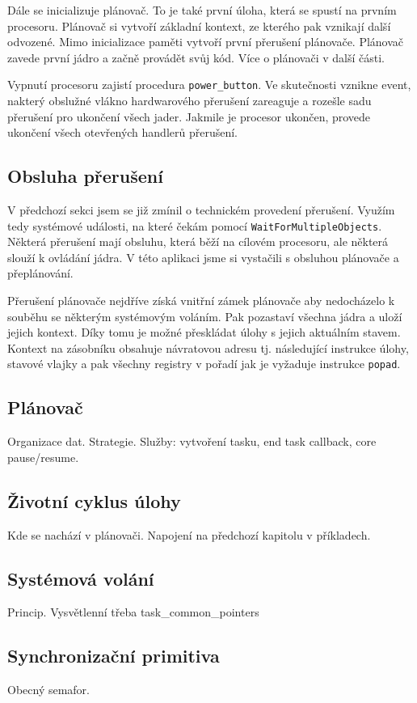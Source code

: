 \documentclass[a4paper,12pt]{article}
\begin{document}
Dále se inicializuje plánovač. To je také první úloha, která se spustí na prvním procesoru.
Plánovač si vytvoří základní kontext, ze kterého pak vznikají další odvozené. Mimo inicializace
paměti vytvoří první přerušení plánovače. Plánovač zavede první jádro a začně provádět
svůj kód. Více o plánovači v další části.

Vypnutí procesoru zajistí procedura \verb+power_button+. Ve skutečnosti vznikne event,
nakterý obslužné vlákno hardwarového přerušení zareaguje a rozešle sadu přerušení pro
ukončení všech jader. Jakmile je procesor ukončen, provede ukončení všech otevřených
handlerů přerušení.

\subsection{Obsluha přerušení}
V předchozí sekci jsem se již zmínil o technickém provedení přerušení. Využím tedy systémové
události, na které čekám pomocí \verb+WaitForMultipleObjects+. Některá přerušení mají
obsluhu, která běží na cílovém procesoru, ale některá slouží k ovládání jádra.
V této aplikaci jsme si vystačili s obsluhou plánovače a přeplánování.

Přerušení plánovače nejdříve získá vnitřní zámek plánovače aby nedocházelo k souběhu
se některým systémovým voláním. Pak pozastaví všechna jádra a uloží jejich kontext.
Díky tomu je možné přeskládat úlohy s jejich aktuálním stavem. Kontext na zásobníku
obsahuje návratovou adresu tj. následující instrukce úlohy, stavové vlajky a pak všechny
registry v pořadí jak je vyžaduje instrukce \texttt{popad}.

\subsection{Plánovač}
Organizace dat.
Strategie.
Služby: vytvoření tasku, end task callback, core pause/resume.

\subsection{Životní cyklus úlohy}
Kde se nachází v plánovači.
Napojení na předchozí kapitolu v příkladech.

\subsection{Systémová volání}
Princip.
Vysvětlenní třeba task\_common\_pointers

\subsection{Synchronizační primitiva}
Obecný semafor.
\end{document}
